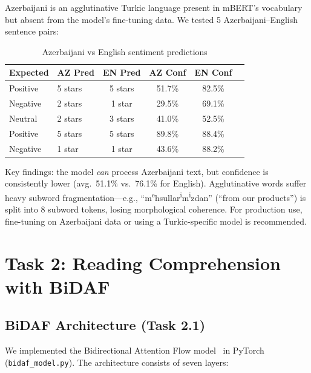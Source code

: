 \documentclass[10pt,a4paper]{article}
\begin{document}
Azerbaijani is an agglutinative Turkic language present in mBERT's vocabulary but absent from the model's fine-tuning data. We tested 5 Azerbaijani--English sentence pairs:

\begin{table}[H]
\centering
\caption{Azerbaijani vs English sentiment predictions}
\label{tab:az-comparison}
\begin{tabular}{llcccc}
\toprule
\textbf{Expected} & \textbf{AZ Pred} & \textbf{EN Pred} & \textbf{AZ Conf} & \textbf{EN Conf} \\
\midrule
Positive & 5 stars & 5 stars & 51.7\% & 82.5\% \\
Negative & 2 stars & 1 star  & 29.5\% & 69.1\% \\
Neutral  & 2 stars & 3 stars & 41.0\% & 52.5\% \\
Positive & 5 stars & 5 stars & 89.8\% & 88.4\% \\
Negative & 1 star  & 1 star  & 43.6\% & 88.2\% \\
\bottomrule
\end{tabular}
\end{table}

Key findings: the model \emph{can} process Azerbaijani text, but confidence is consistently lower (avg.\ 51.1\% vs.\ 76.1\% for English). Agglutinative words suffer heavy subword fragmentation---e.g., ``m\textsuperscript{e}hsullar\textsuperscript{i}m\textsuperscript{i}zdan'' (``from our products'') is split into 8 subword tokens, losing morphological coherence. For production use, fine-tuning on Azerbaijani data or using a Turkic-specific model is recommended.


\section{Task 2: Reading Comprehension with BiDAF}

\subsection{BiDAF Architecture (Task 2.1)}

We implemented the Bidirectional Attention Flow model~\cite{seo2017bidaf} in PyTorch (\texttt{bidaf\_model.py}). The architecture consists of seven layers:
\end{document}
